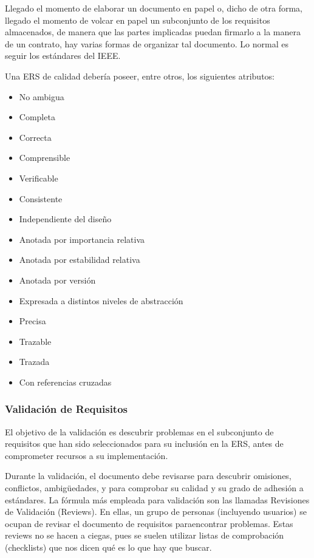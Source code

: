 Llegado el momento de elaborar un documento en papel o, dicho de otra
forma, llegado el momento de volcar en papel un subconjunto de los
requisitos almacenados, de manera que las partes implicadas puedan
firmarlo a la manera de un contrato, hay varias formas de organizar
tal documento. Lo normal es seguir los estándares del IEEE.

Una ERS de calidad debería poseer, entre otros, los siguientes atributos:

\begin{itemize}[noitemsep]
\item No ambigua
\item Completa
\item Correcta
\item Comprensible
\item Verificable
\item Consistente
\item Independiente del diseño
\item Anotada por importancia relativa
\item Anotada por estabilidad relativa
\item Anotada por versión
\item Expresada a distintos niveles de abstracción
\item Precisa
\item Trazable
\item Trazada
\item Con referencias cruzadas
\end{itemize}

\subsubsection{Validación de Requisitos}
\label{sec:requisitos:validacion}

El objetivo de la validación es descubrir problemas en el subconjunto
de requisitos que han sido seleccionados para su inclusión en la ERS,
antes de comprometer recursos a su implementación.

Durante la validación, el documento debe revisarse para descubrir
omisiones, conflictos, ambigüedades, y para comprobar su calidad y su
grado de adhesión a estándares. La fórmula más empleada para
validación son las llamadas Revisiones de Validación (Reviews). En
ellas, un grupo de personas (incluyendo usuarios) se ocupan de revisar
el documento de requisitos paraencontrar problemas. Estas reviews no
se hacen a ciegas, pues se suelen utilizar listas de comprobación
(checklists) que nos dicen qué es lo que hay que buscar.

